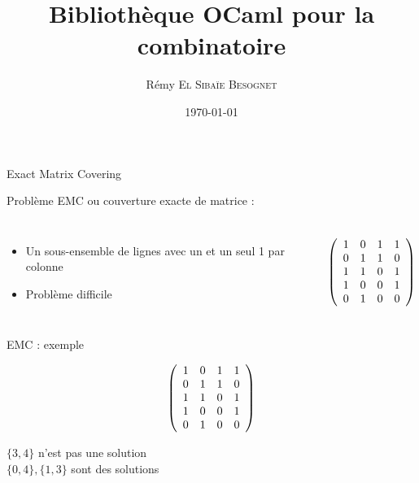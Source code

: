 \documentclass{beamer}
\begin{document}
\author{Rémy \textsc{El Sibaïe Besognet}}
\title{Bibliothèque OCaml pour la combinatoire}
\date{\today}

\begin{frame}
  \titlepage
\end{frame}

\begin{frame}{Exact Matrix Covering}

Problème EMC ou couverture exacte de matrice :


 \begin{columns}

				\begin{itemize}
				\item Un sous-ensemble de lignes avec un et un seul 1 par colonne
				\item Problème difficile
				\end{itemize}

  \begin{displaymath}
   \left(\begin{array}{ c c c c c }
   1 & 0 & 1 & 1 \\
   0 & 1 & 1 & 0 \\
   1 & 1 & 0 & 1 \\
   1 & 0 & 0 & 1 \\
   0 & 1 & 0 & 0
  \end{array}\right)
  \end{displaymath}

  \end{columns}
\end{frame}


\begin{frame}{EMC : exemple}

\begin{displaymath}
   \left(\begin{array}{ c c c c c }
   1 & 0 & 1 & 1 \\
   0 & 1 & 1 & 0 \\
   1 & 1 & 0 & 1 \\
   1 & 0 & 0 & 1 \\
   0 & 1 & 0 & 0
  \end{array}\right)
  \end{displaymath}

\begin{center}
$ \{3, 4\} $ n'est pas une solution\\
$ \{0, 4\}, \{1, 3\} $ sont des solutions
\end{center}
\end{frame}
\end{document}
